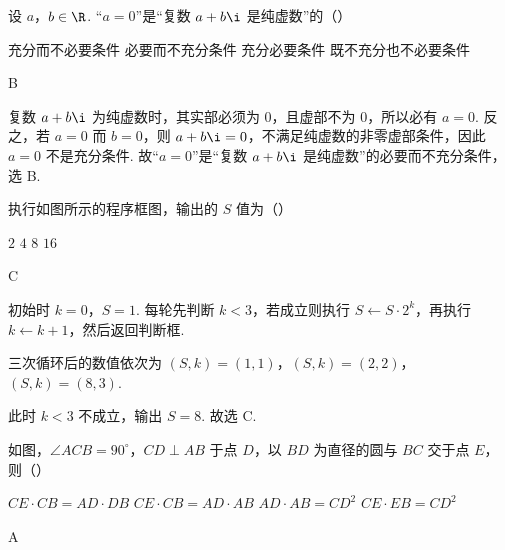 \begin{problem}
设 \(a\)，\(b \in \R\). “\(a=0\)”是“复数 \(a+b\i\) 是纯虚数”的（\quad）

\choices
    {充分而不必要条件}
    {必要而不充分条件}
    {充分必要条件}
    {既不充分也不必要条件}
\end{problem}

\begin{answer}
B
\end{answer}

\begin{solution}
复数 \(a+b\i\) 为纯虚数时，其实部必须为 \(0\)，且虚部不为 \(0\)，所以必有 \(a=0\). 反之，若 \(a=0\) 而 \(b=0\)，则 \(a+b\i=0\)，不满足纯虚数的非零虚部条件，因此 \(a=0\) 不是充分条件. 故“\(a=0\)”是“复数 \(a+b\i\) 是纯虚数”的必要而不充分条件，选 B.
\end{solution}

\begin{problem}
执行如图所示的程序框图，输出的 \(S\) 值为（\quad）


\choices
    {\(2\)}
    {\(4\)}
    {\(8\)}
    {\(16\)}
\end{problem}

\begin{answer}
C
\end{answer}

\begin{solution}
初始时 \(k=0\)，\(S=1\). 每轮先判断 \(k<3\)，若成立则执行 \(S\leftarrow S\cdot 2^k\)，再执行 \(k\leftarrow k+1\)，然后返回判断框.

三次循环后的数值依次为 \((S,k)=(1,1)\)，\((S,k)=(2,2)\)，\((S,k)=(8,3)\).

此时 \(k<3\) 不成立，输出 \(S=8\). 故选 C.
\end{solution}

\begin{problem}
如图，\(\angle ACB = 90^{\circ}\)，\(CD \perp AB\) 于点 \(D\)，以 \(BD\) 为直径的圆与 \(BC\) 交于点 \(E\)，则（\quad）


\choices
    {\(CE \cdot CB = AD \cdot DB\)}
    {\(CE\cdot CB = AD\cdot AB\)}
    {\(AD\cdot AB = CD^{2}\)}
    {\(CE\cdot EB = CD^{2}\)}
\end{problem}

\begin{answer}
A
\end{answer}


